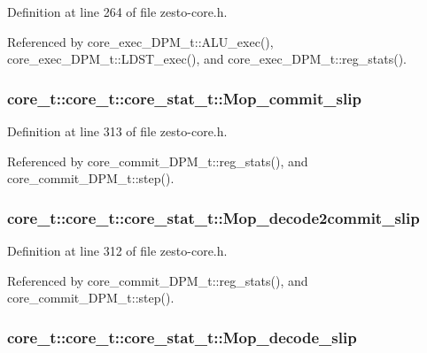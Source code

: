 Definition at line 264 of file zesto-core.h.

Referenced by core\_\-exec\_\-DPM\_\-t::ALU\_\-exec(), core\_\-exec\_\-DPM\_\-t::LDST\_\-exec(), and core\_\-exec\_\-DPM\_\-t::reg\_\-stats().
\subsubsection[{Mop\_\-commit\_\-slip}]{ core\_\-t::core\_\-t::core\_\-stat\_\-t::Mop\_\-commit\_\-slip}\label{structcore__t_1_1core__stat__t_34d777376f04eeaeb7a930b8e3df9fdd}




Definition at line 313 of file zesto-core.h.

Referenced by core\_\-commit\_\-DPM\_\-t::reg\_\-stats(), and core\_\-commit\_\-DPM\_\-t::step().
\subsubsection[{Mop\_\-decode2commit\_\-slip}]{ core\_\-t::core\_\-t::core\_\-stat\_\-t::Mop\_\-decode2commit\_\-slip}\label{structcore__t_1_1core__stat__t_519e564423324c4a9a81ed285d6b98a6}




Definition at line 312 of file zesto-core.h.

Referenced by core\_\-commit\_\-DPM\_\-t::reg\_\-stats(), and core\_\-commit\_\-DPM\_\-t::step().
\subsubsection[{Mop\_\-decode\_\-slip}]{ core\_\-t::core\_\-t::core\_\-stat\_\-t::Mop\_\-decode\_\-slip}\label{structcore__t_1_1core__stat__t_5b29d573d49d3e185fcf636cbd41d098}




